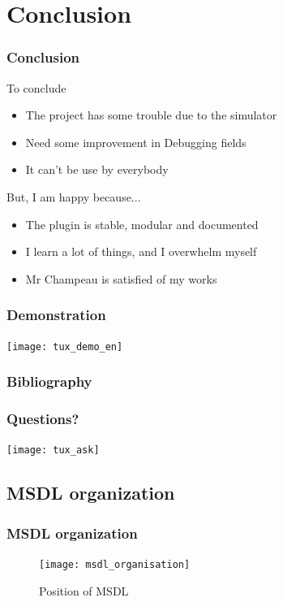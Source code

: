 \documentclass[10pt, svgnames, compress, red]{beamer}
\begin{document}
\section{Conclusion}
\begin{frame}
  \frametitle{Conclusion}
  \begin{alertblock}{To conclude}
    \begin{itemize}
    \item The project has some trouble due to the simulator
    \item Need some improvement in Debugging fields
    \item It can't be use by everybody
    \end{itemize}
  \end{alertblock}
  \begin{alertblock}{But, I am happy because...}
    \begin{itemize}
    \item The plugin is stable, modular and documented
    \item I learn a lot of things, and I overwhelm myself
    \item Mr Champeau is satisfied of my works
    \end{itemize}
  \end{alertblock}
  \transdissolve[duration=0.1]
\end{frame}



\begin{frame}[allowframebreaks]
  \frametitle{Demonstration}
  \texttt{[image: tux\_demo\_en]}
  \transdissolve[duration=0.1]
\end{frame}


\begin{frame}[allowframebreaks]
  \frametitle{Bibliography}
  \nocite{*}
  
  \transdissolve[duration=0.1]
\end{frame}


\begin{frame}
  \frametitle{Questions?}

  \begin{center}
    \texttt{[image: tux\_ask]}
  \end{center}
  \transdissolve[duration=0.1]
\end{frame}

\appendix
\subsection{MSDL organization}
\begin{frame}
  \frametitle{MSDL organization}
  \begin{figure}[h]
    \centering
    \texttt{[image: msdl\_organisation]}
    \caption{Position of MSDL}
  \end{figure}
  \transdissolve[duration=0.1]
\end{frame}
\end{document}
